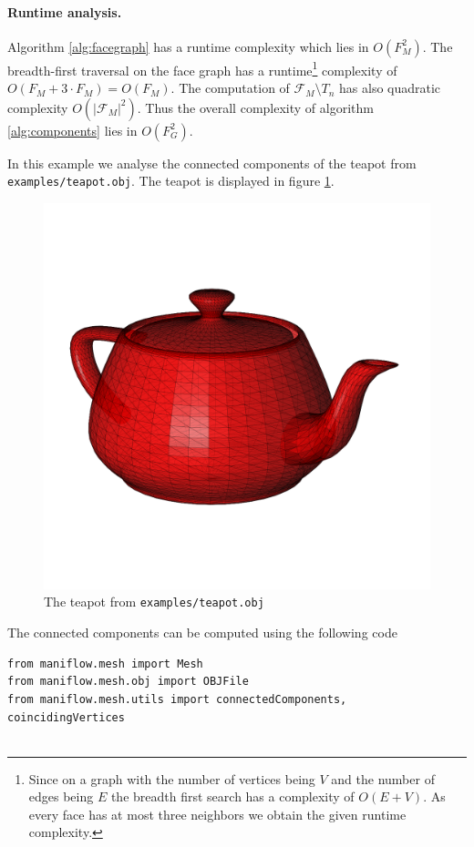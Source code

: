 \paragraph{Runtime analysis.} Algorithm \ref{alg:facegraph} has a runtime complexity which lies in $O(F_M^2)$. The breadth-first traversal on the face graph has a runtime\footnote{Since on a graph with the number of vertices being $V$ and the number of edges being $E$ the breadth first search has a complexity of $O(E + V)$. As every face has at most three neighbors we obtain the given runtime complexity.} complexity of $O(F_M + 3\cdot F_M) = O(F_M)$. The computation of $\mathcal{F}_M\setminus T_n$ has also quadratic complexity $O(\vert\mathcal{F}_M\vert^2)$. Thus the overall complexity of algorithm \ref{alg:components} lies in $O(F_G^2)$.
\begin{ex}
    In this example we analyse the connected components of the teapot from \texttt{examples/teapot.obj}. The teapot is displayed in figure \ref{fig:teapot}.
    \begin{figure}[h]
        \centering
        \includegraphics[scale=0.15]{img/teapot.png}
        \caption{The teapot from \texttt{examples/teapot.obj}}
        \label{fig:teapot}
    \end{figure}
    \newline\noindent The connected components can be computed using the following code
    \begin{lstlisting}
from maniflow.mesh import Mesh
from maniflow.mesh.obj import OBJFile
from maniflow.mesh.utils import connectedComponents, coincidingVertices


\end{lstlisting}
\end{ex}
